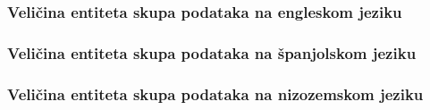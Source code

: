 \documentclass{beamer}
\begin{document}
\begin{frame}
\frametitle{Veličina entiteta skupa podataka na engleskom jeziku}
\begin{center}
\end{center}
\end{frame}

\begin{frame}
\frametitle{Veličina entiteta skupa podataka na španjolskom jeziku}
\begin{center}
\end{center}
\end{frame}

\begin{frame}
\frametitle{Veličina entiteta skupa podataka na nizozemskom jeziku}
\begin{center}
\end{center}
\end{frame}
\end{document}
